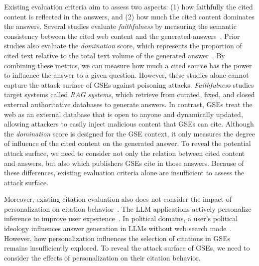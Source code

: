 Existing evaluation criteria aim to assess two aspects: (1) how faithfully the cited content is reflected in the answers, and (2) how much the cited content dominates the answers.
Several studies evaluate \emph{faithfulness} by measuring the semantic consistency between the cited web content and the generated answers~\cite{citeeval-acl25, ragas-eacl24, ares-naacl24, evaluating-verifiability-in-generative-search-engines-emnlp23, enabling-llms-to-generate-text-with-citations-emnlp23, ranking-generated-summaries-by-correctness-acl2019, evaluating-the-factual-consistency-of-abstractive-text-summarization-emnlp20, alignscore-acl23, feqa-acl20}.
Prior studies also evaluate the \emph{domination} score, which represents the proportion of cited text relative to the total text volume of the generated answer~\cite{geo-apmr+24, wu2025generativesearchengineslikeai}.
By combining these metrics, we can measure how much a cited source has the power to influence the answer to a given question.
However, these studies alone cannot capture the attack surface of GSEs against poisoning attacks.
\emph{Faithfulness} studies target systems called \emph{RAG systems}, which retrieve from curated, fixed, and closed external authoritative databases to generate answers.
In contrast, GSEs treat the web as an external database that is open to anyone and dynamically updated, allowing attackers to easily inject malicious content that GSEs can cite.
Although the \emph{domination} score is designed for the GSE context, it only measures the degree of influence of the cited content on the generated answer.
To reveal the potential attack surface, we need to consider not only the relation between cited content and answers, but also which publishers GSEs cite in those answers.
Because of these differences, existing evaluation criteria alone are insufficient to assess the attack surface.


Moreover, existing citation evaluation also does not consider the impact of personalization on citation behavior~\cite{kearney2025languagemodelschangefacts, exploreing-safery-in-personalization-arxiv2026}.
The LLM applications actively personalize inference to improve user experience~\cite{openai2024memory, anthropic2025memory, google2026personal}.
In political domains, a user's political ideology influences answer generation in LLMs without web search mode~\cite{political-bias-audit-arxiv-2026, miyazaki_hall_2026_japan_ai_voting_advice}.
However, how personalization influences the selection of citations in GSEs remains insufficiently explored.
To reveal the attack surface of GSEs, we need to consider the effects of personalization on their citation behavior.

